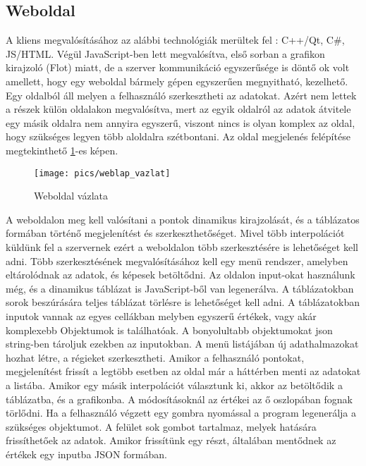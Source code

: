\subsection{Weboldal}
	A kliens megvalósításához az alábbi technológiák merültek fel : C++/Qt, C\#, JS/HTML. Végül JavaScript-ben lett megvalósítva, első sorban a grafikon kirajzoló (Flot) miatt, de a szerver kommunikáció egyszerűsége is döntő ok volt amellett, hogy egy weboldal bármely gépen egyszerűen megnyitható, kezelhető.\newline
	Egy oldalból áll melyen a felhasználó szerkesztheti az adatokat. Azért nem lettek a részek külön oldalakon megvalósítva, mert az egyik oldalról az adatok átvitele egy másik oldalra nem annyira egyszerű, viszont nincs is olyan komplex az oldal, hogy szükséges legyen több aloldalra szétbontani. 
	Az oldal megjelenés felépítése megtekinthető \ref{fig:weblap_vazlat}-es képen.
	\begin{figure}[h]
	\texttt{[image: pics/weblap\_vazlat]}
	\centering
	\caption{Weboldal vázlata\label{fig:weblap_vazlat}}
	\end{figure}
	A weboldalon meg kell valósítani a pontok dinamikus kirajzolását, és a táblázatos formában történő megjelenítést és szerkeszthetőséget. Mivel több interpolációt küldünk fel a szervernek ezért a weboldalon több szerkesztésére is lehetőséget kell adni. \newline 
	Több szerkesztésének megvalósításához kell egy menü rendszer, amelyben eltárolódnak az adatok, és képesek betöltődni.\newline
	Az oldalon input-okat használunk még, és a dinamikus táblázat is JavaScript-ből van legenerálva. A táblázatokban sorok beszúrására teljes táblázat törlésre is lehetőséget kell adni. 
	A táblázatokban inputok vannak az egyes cellákban melyben egyszerű értékek, vagy akár komplexebb Objektumok is találhatóak. A bonyolultabb objektumokat json string-ben tároljuk ezekben az inputokban. \newline
	A menü listájában új adathalmazokat hozhat létre, a régieket szerkesztheti.
	Amikor a felhasználó pontokat, megjelenítést frissít a legtöbb esetben az oldal már a háttérben menti az adatokat a listába. Amikor egy másik interpolációt választunk ki, akkor az betöltődik a táblázatba, és a grafikonba. A módosításoknál az értékei az ő oszlopában fognak törlődni.
	Ha a felhasználó végzett egy gombra nyomással a program legenerálja a szükséges objektumot. \newline
	A felület sok gombot tartalmaz, melyek hatására frissíthetőek az adatok. Amikor frissítünk egy részt, általában mentődnek az értékek egy inputba JSON formában.\newline
